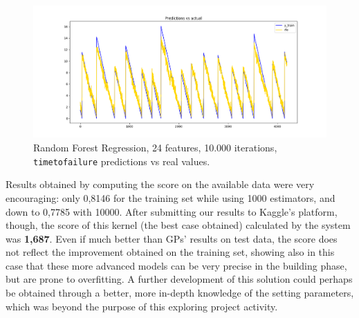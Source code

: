 \begin{figure} [h]
	\centering
	\includegraphics[width=1\linewidth]{pictures/randomforest10000.png}
	\caption{Random Forest Regression, 24 features, 10.000 iterations, \texttt{time\textunderscore to\textunderscore failure} predictions vs real values.}
	\label{fig:RF10000}
\end{figure}

Results obtained by computing the score on the available data were very encouraging: only 0,8146 for the training set while using 1000 estimators, and down to 0,7785 with 10000. After submitting our results to Kaggle's platform, though, the score of this kernel (the best case obtained) calculated by the system was \textbf{1,687}. Even if much better than GPs' results on test data, the score does not reflect the improvement obtained on the training set, showing also in this case that these more advanced models can be very precise in the building phase, but are prone to overfitting. A further development of this solution could perhaps be obtained through a better, more in-depth knowledge of the setting parameters, which was beyond the purpose of this exploring project activity.
